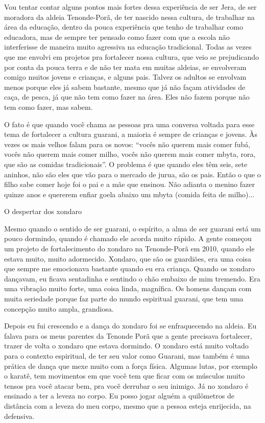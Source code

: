 \documentclass{article}
\begin{document}
Vou tentar contar alguns pontos mais fortes dessa experi\^encia de ser
Jera, de ser moradora da aldeia Tenonde-Por\~a, de ter nascido nessa
cultura, de trabalhar na \'area da educa\c{c}\~ao, dentro da pouca
experi\^encia que tenho de trabalhar como educadora, mas de sempre ter
pensado como fazer com que a escola n\~ao interferisse de maneira muito
agressiva na educa\c{c}\~ao tradicional. Todas as vezes que me envolvi
em projetos pra fortalecer nossa cultura, que veio se prejudicando por
conta da pouca terra e de n\~ao ter mata em muitas aldeias, se
envolveram comigo muitos jovens e crian\c{c}as, e alguns pais. Talvez
os adultos se envolvam menos porque eles j\'a sabem bastante, mesmo que
j\'a n\~ao fa\c{c}am atividades de ca\c{c}a, de pesca, j\'a que n\~ao
tem como fazer na \'area. Eles n\~ao fazem porque n\~ao tem como fazer,
mas sabem.

O fato \'e que quando voc\^e chama as pessoas pra uma conversa voltada
para esse tema de fortalecer a cultura guarani, a maioria \'e sempre de
crian\c{c}as e jovens. \`As vezes os mais velhos falam para os novos:
{\textquotedblleft}voc\^es n\~ao querem mais comer fub\'a, voc\^es
n\~ao querem mais comer milho, voc\^es n\~ao querem mais comer mbyta,
rora, que s\~ao as comidas tradicionais{\textquotedblright}. O problema
\'e que quando eles t\^em seis, sete aninhos, n\~ao s\~ao eles que
v\~ao para o mercado de jurua, s\~ao os pais. Ent\~ao o que o filho
sabe comer hoje foi o pai e a m\~ae que ensinou. N\~ao adianta o menino
fazer quinze anos e quererem enfiar goela abaixo um mbyta (comida feita
de milho)...

O despertar dos xondaro

Mesmo quando o sentido de ser guarani, o esp\'irito, a alma de ser
guarani est\'a um pouco dormindo, quando \'e chamado ele acorda muito
r\'apido. A gente come\c{c}ou um projeto de fortalecimento do xondaro
na Tenonde-Por\~a em 2010, quando ele estava muito, muito adormecido.
Xondaro, que s\~ao os guardi\~oes, era uma coisa que sempre me
emocionava bastante quando eu era crian\c{c}a. Quando os xondaro
dan\c{c}avam, eu ficava sentadinha e sentindo o ch\~ao embaixo de mim
tremendo. Era uma vibra\c{c}\~ao muito forte, uma coisa linda,
magn\'ifica. Os homens dan\c{c}am com muita seriedade porque faz parte
do mundo espiritual guarani, que tem uma concep\c{c}\~ao muito ampla,
grandiosa.

Depois eu fui crescendo e a dan\c{c}a do xondaro foi se enfraquecendo na
aldeia. Eu falava para os meus parentes da Tenonde Por\~a que a gente
precisava fortalecer, trazer de volta o xondaro que estava dormindo. O
xondaro est\'a muito voltado para o contexto espiritual, de ter seu
valor como Guarani, mas tamb\'em \'e uma pr\'atica de dan\c{c}a que
mexe muito com a for\c{c}a f\'isica. Algumas lutas, por exemplo o
karat\^e, tem movimentos em que voc\^e tem que ficar com os m\'usculos
muito tensos pra voc\^e atacar bem, pra voc\^e derrubar o seu inimigo.
J\'a no xondaro \'e ensinado a ter a leveza no corpo. Eu posso jogar
algu\'em a quil\^ometros de dist\^ancia com a leveza do meu corpo,
mesmo que a pessoa esteja enrijecida, na defensiva.
\end{document}
